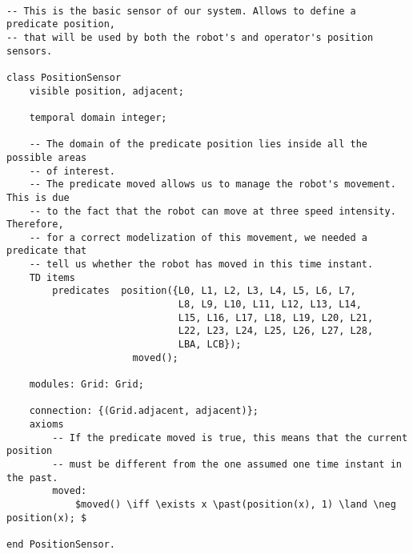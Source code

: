 \begin{lstlisting}[fontadjust, mathescape, frame=single]

-- This is the basic sensor of our system. Allows to define a predicate position,
-- that will be used by both the robot's and operator's position sensors.

class PositionSensor
    visible position, adjacent;

    temporal domain integer;
    
    -- The domain of the predicate position lies inside all the possible areas
    -- of interest. 
    -- The predicate moved allows us to manage the robot's movement. This is due
    -- to the fact that the robot can move at three speed intensity. Therefore, 
    -- for a correct modelization of this movement, we needed a predicate that 
    -- tell us whether the robot has moved in this time instant.
    TD items 
        predicates  position({L0, L1, L2, L3, L4, L5, L6, L7,
                              L8, L9, L10, L11, L12, L13, L14,
                              L15, L16, L17, L18, L19, L20, L21,
                              L22, L23, L24, L25, L26, L27, L28,
                              LBA, LCB});
                      moved();

    modules: Grid: Grid;

    connection: {(Grid.adjacent, adjacent)};
    axioms
        -- If the predicate moved is true, this means that the current position
        -- must be different from the one assumed one time instant in the past.
        moved: 
            $moved() \iff \exists x \past(position(x), 1) \land \neg position(x); $

end PositionSensor.
\end{lstlisting}